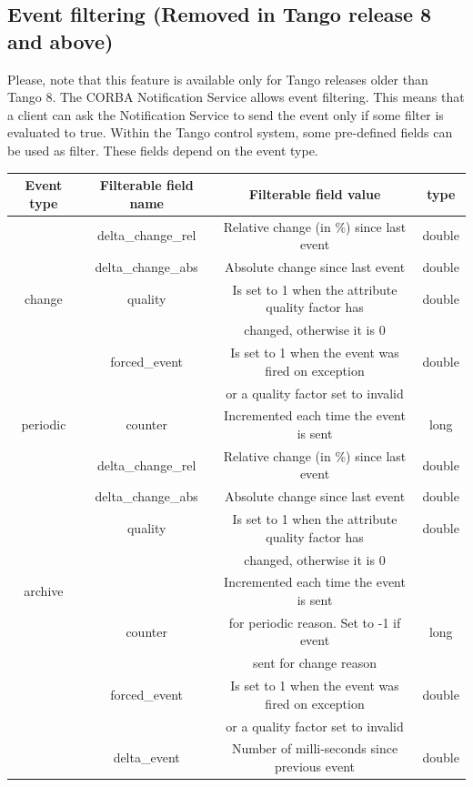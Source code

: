 \subsection{Event filtering (Removed in Tango release 8 and above)}

Please, note that this feature is available only for Tango releases
older than Tango 8. The CORBA Notification Service allows event filtering.
This means that a client can ask the Notification Service to send
the event only if some filter is evaluated to true. Within the Tango
control system, some pre-defined fields can be used as filter. These
fields depend on the event type.

\vspace{0.3cm}

\begin{center}
\begin{longtable}{|c|c|c|c|}
\hline 
Event type & Filterable field name & Filterable field value & type\tabularnewline
\hline 
\hline 
 & delta\_change\_rel & Relative change (in \%) since last event & double\tabularnewline
\cline{2-4} 
\multicolumn{1}{|c|}{} & delta\_change\_abs & Absolute change since last event & double\tabularnewline
\cline{2-4} 
\multicolumn{1}{|c|}{change} & quality & Is set to 1 when the attribute quality factor has & double\tabularnewline
\multicolumn{1}{|c|}{} &  & changed, otherwise it is 0 & \tabularnewline
\cline{2-4} 
\multicolumn{1}{|c|}{} & forced\_event & Is set to 1 when the event was fired on exception  & double\tabularnewline
\multicolumn{1}{|c|}{} &  & or a quality factor set to invalid & \tabularnewline
\hline 
periodic & counter & Incremented each time the event is sent & long\tabularnewline
\hline 
\multicolumn{1}{|c|}{} & delta\_change\_rel & Relative change (in \%) since last event & double\tabularnewline
\cline{2-4} 
\multicolumn{1}{|c|}{} & delta\_change\_abs & Absolute change since last event & double\tabularnewline
\cline{2-4} 
 & quality & Is set to 1 when the attribute quality factor has & double\tabularnewline
 &  & changed, otherwise it is 0 & \tabularnewline
\cline{2-4} 
\multicolumn{1}{|c|}{archive} &  & Incremented each time the event is sent & \tabularnewline
\multicolumn{1}{|c|}{} & counter & for periodic reason. Set to -1 if event & long\tabularnewline
\multicolumn{1}{|c|}{} &  & sent for change reason & \tabularnewline
\cline{2-4} 
\multicolumn{1}{|c|}{} & forced\_event & Is set to 1 when the event was fired on exception & double\tabularnewline
\multicolumn{1}{|c|}{} &  & or a quality factor set to invalid & \tabularnewline
\cline{2-4} 
 & delta\_event & Number of milli-seconds since previous event & double\tabularnewline
\hline 
\end{longtable}
\par\end{center}

